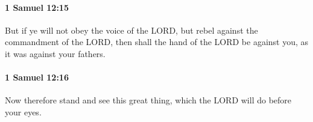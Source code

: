 		\paragraph{1 Samuel 12:15} %
			\label{1SAMUEL-12-15}

			But if ye will not obey the voice of the LORD, but rebel against the commandment of the LORD, then shall the hand of the LORD be against you, as it was against your fathers.


		\paragraph{1 Samuel 12:16} %
			\label{1SAMUEL-12-16}

			Now therefore stand and see this great thing, which the LORD will do before your eyes.



